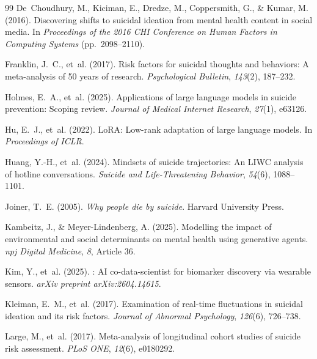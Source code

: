 \documentclass[review,12pt,authoryear]{elsarticle}
\begin{document}
\begin{thebibliography}{99}
De~Choudhury, M., Kiciman, E., Dredze, M., Coppersmith, G., \& Kumar, M. (2016).
\newblock Discovering shifts to suicidal ideation from mental health content in social media.
\newblock In \textit{Proceedings of the 2016 CHI Conference on Human Factors in Computing Systems} (pp.\ 2098--2110).

Franklin, J.~C., et~al. (2017).
\newblock Risk factors for suicidal thoughts and behaviors: {A} meta-analysis of 50 years of research.
\newblock \textit{Psychological Bulletin}, \textit{143}(2), 187--232.

Holmes, E.~A., et~al. (2025).
\newblock Applications of large language models in suicide prevention: {S}coping review.
\newblock \textit{Journal of Medical Internet Research}, \textit{27}(1), e63126.

Hu, E.~J., et~al. (2022).
\newblock Lo{RA}: {L}ow-rank adaptation of large language models.
\newblock In \textit{Proceedings of ICLR}.

Huang, Y.-H., et~al. (2024).
\newblock Mindsets of suicide trajectories: {A}n {LIWC} analysis of hotline conversations.
\newblock \textit{Suicide and Life-Threatening Behavior}, \textit{54}(6), 1088--1101.

Joiner, T.~E. (2005).
\newblock \textit{Why people die by suicide}.
\newblock Harvard University Press.

Kambeitz, J., \& Meyer-Lindenberg, A. (2025).
\newblock Modelling the impact of environmental and social determinants on mental health using generative agents.
\newblock \textit{npj Digital Medicine}, \textit{8}, Article 36.

Kim, Y., et~al. (2025).
: {AI} co-data-scientist for biomarker discovery via wearable sensors.
\newblock \textit{arXiv preprint arXiv:2604.14615}.

Kleiman, E.~M., et~al. (2017).
\newblock Examination of real-time fluctuations in suicidal ideation and its risk factors.
\newblock \textit{Journal of Abnormal Psychology}, \textit{126}(6), 726--738.

Large, M., et~al. (2017).
\newblock Meta-analysis of longitudinal cohort studies of suicide risk assessment.
\newblock \textit{PLoS ONE}, \textit{12}(6), e0180292.



\end{thebibliography}
\end{document}
